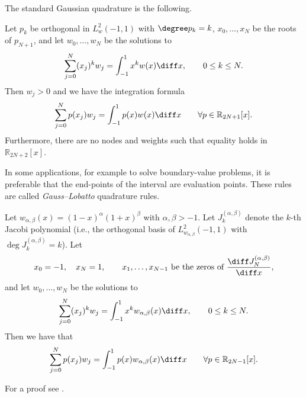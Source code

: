 The standard Gaussian quadrature is the following.
\begin{strongtheorem}
    \label{thm:Gauss integration}
    Let $p_k$ be orthogonal in $L^2_w(-1,1)$ with $\degree p_k = k$, $x_0, \dots, x_N$ be the roots of $p_{N+1}$, and let $w_0, \dots, w_N$ be the solutions to
    \begin{equation*}
        \sum_{j=0}^N (x_j)^k w_j = \int_{-1}^1 x^k w(x) \diff x, \qquad 0 \le k \le N.
    \end{equation*}
    Then $w_j > 0$ and we have the integration formula
    \begin{equation}
        \label{eq:Gauss integration}
        \sum_{j=0}^N p(x_j) w_j = \int_{-1}^1 p(x) w(x) \diff x \qquad \forall p \in \mathbb R_{2N+1}[x].
    \end{equation}
    Furthermore, there are no nodes and weights such that equality holds in $\mathbb R_{2N+2}[x]$.
\end{strongtheorem}
In some applications, for example to solve boundary-value problems, it is preferable that the end-points of the interval are evaluation points. These rules are called \emph{Gauss--Lobatto} quadrature rules.
\begin{strongtheorem}
    \label{thm:Gauss-Lobatto integration Jacobi weights}
    Let $w_{\alpha,\beta}(x) = (1 - x)^\alpha (1 + x)^\beta$ with $\alpha, \beta > -1$.
    Let $J^{(\alpha,\beta)}_k$ denote the $k$-th Jacobi polynomial (i.e., the orthogonal basis of $L^2_{w_{\alpha,\beta}}(-1,1)$ with $\deg J^{(\alpha,\beta)}_k=k$).
    Let
    \begin{equation*}
        x_0 = -1, \quad x_N = 1, \qquad x_1, \dots, x_{N-1} \text{ be the zeros of } \frac{\diff J_N^{(\alpha,\beta)}}{\diff x},
    \end{equation*}
    and
    let $w_0, \dots, w_N$ be the solutions to
    \begin{equation*}
        \sum_{j=0}^N (x_j)^k w_j = \int_{-1}^1 x^k w_{\alpha,\beta}(x) \diff x, \qquad 0 \le k \le N.
    \end{equation*}
    Then we have that
    \begin{equation}
        \label{eq:Gauss-Lobatto integration}
        \sum_{j=0}^N p(x_j) w_j = \int_{-1}^1 p(x) w_{\alpha,\beta}(x) \diff x \qquad \forall p \in \mathbb R_{2N-1}[x].
    \end{equation}
\end{strongtheorem}
For a proof see \cite{QuarteroniSaccoSaleri2007}.

